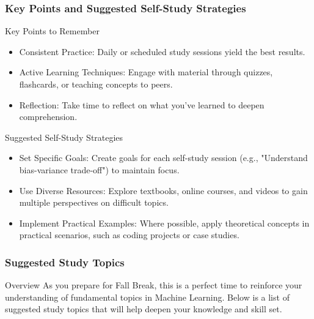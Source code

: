 \documentclass[aspectratio=169]{beamer}
\begin{document}
\begin{frame}[fragile]
  \frametitle{Key Points and Suggested Self-Study Strategies}
  \begin{block}{Key Points to Remember}
    \begin{itemize}
      \item Consistent Practice: Daily or scheduled study sessions yield the best results.
      \item Active Learning Techniques: Engage with material through quizzes, flashcards, or teaching concepts to peers.
      \item Reflection: Take time to reflect on what you’ve learned to deepen comprehension.
    \end{itemize}
  \end{block}
  
  \begin{block}{Suggested Self-Study Strategies}
    \begin{itemize}
      \item Set Specific Goals: Create goals for each self-study session (e.g., "Understand bias-variance trade-off") to maintain focus.
      \item Use Diverse Resources: Explore textbooks, online courses, and videos to gain multiple perspectives on difficult topics.
      \item Implement Practical Examples: Where possible, apply theoretical concepts in practical scenarios, such as coding projects or case studies.
    \end{itemize}
  \end{block}
\end{frame}

\begin{frame}[fragile]
    \frametitle{Suggested Study Topics}
    \begin{block}{Overview}
        As you prepare for Fall Break, this is a perfect time to reinforce your understanding of fundamental topics in Machine Learning. Below is a list of suggested study topics that will help deepen your knowledge and skill set.
    \end{block}
\end{frame}
\end{document}
